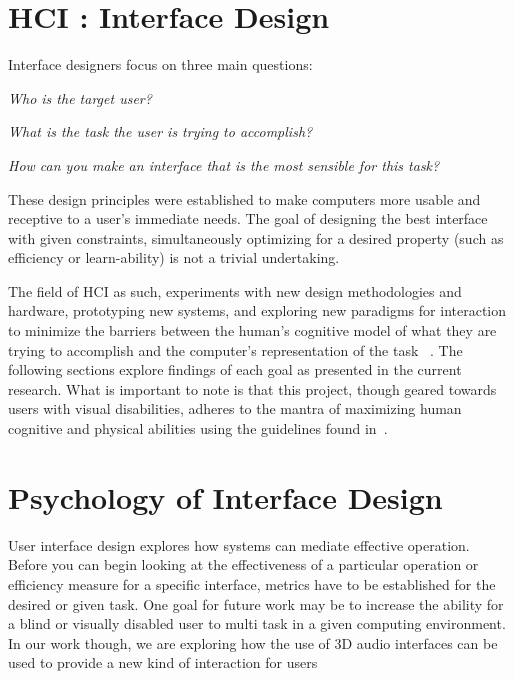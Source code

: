 \section{                 HCI : Interface Design                             }

Interface designers focus on three main questions:

\textit{Who is the target user?}

\textit{What is the task the user is trying to accomplish?}

\textit{How can you make an interface that is the most sensible for this task?}

These design principles were established to make computers more usable and
receptive to a user's immediate needs. The goal of designing the best interface
with given constraints, simultaneously optimizing for a desired property (such
as efficiency or learn-ability) is not a trivial undertaking.

The field of HCI as such, experiments with new design methodologies and
hardware, prototyping new systems, and exploring new paradigms for interaction
to minimize the  barriers between the human's cognitive model of what they are
trying to accomplish and the computer's representation of the task
~\cite{baecker1987human}. The following sections explore findings of each goal
as presented in the current research.  What is important to note is that this
project, though geared towards users with visual disabilities, adheres to
the mantra of maximizing human cognitive and physical abilities using the
guidelines found in~\cite{reeves2004guidelines}.

\section{                  Psychology of Interface Design                    }

User interface design explores how systems can mediate effective operation.
Before you can begin looking at the effectiveness of a particular operation or
efficiency measure for a specific interface, metrics have to be established for
the desired or given task. One goal for future work may be to increase the
ability for a blind or visually disabled user to multi task in a given computing
environment.  In our work though, we are exploring how the use of 3D audio
interfaces can be used to provide a new kind of interaction for users 

